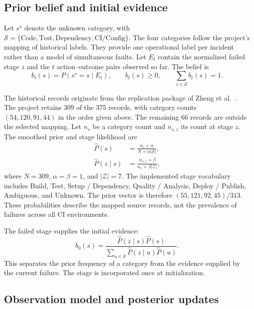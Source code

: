 \documentclass{article}
\begin{document}
\subsection{Prior belief and initial evidence}

Let $s^\star$ denote the unknown category, with
$\mathcal{S}=\{\text{Code},\text{Test},\text{Dependency},\text{CI/Config}\}$.
The four categories follow the project's mapping of historical labels.
They provide one operational label per incident rather than a model of
simultaneous faults. Let $E_t$ contain the normalized failed stage $z$ and
the $t$ action--outcome pairs observed so far. The belief is
\begin{equation}
b_t(s)=P(s^\star=s\mid E_t),
\qquad b_t(s)\geq 0,
\qquad \sum_{s\in\mathcal{S}}b_t(s)=1.
\label{eq:prob_belief}
\end{equation}

The historical records originate from the replication package of Zheng
et al.~\cite{Zheng2026WorkflowFailures}. The project retains 309 of the
375 records, with category counts $(54,120,91,44)$ in the order given above.
The remaining 66 records are outside the selected mapping. Let $n_s$ be a
category count and $n_{s,z}$ its count at stage $z$. The smoothed prior and
stage likelihood are
\begin{align}
\widehat{P}(s)
&=\frac{n_s+\alpha}{N+\alpha|\mathcal{S}|},
\label{eq:prob_prior}\\
\widehat{P}(z\mid s)
&=\frac{n_{s,z}+\beta}{n_s+\beta|\mathcal{Z}|},
\label{eq:prob_stage}
\end{align}
where $N=309$, $\alpha=\beta=1$, and $|\mathcal{Z}|=7$. The implemented
stage vocabulary includes Build, Test, Setup / Dependency, Quality /
Analysis, Deploy / Publish, Ambiguous, and Unknown. The prior vector is
therefore $(55,121,92,45)/313$. These probabilities describe the mapped
source records, not the prevalence of failures across all CI environments.

The failed stage supplies the initial evidence:
\begin{equation}
b_0(s)=
\frac{\widehat{P}(z\mid s)\widehat{P}(s)}
{\sum_{u\in\mathcal{S}}\widehat{P}(z\mid u)\widehat{P}(u)}.
\label{eq:prob_initial_posterior}
\end{equation}
This separates the prior frequency of a category from the evidence supplied
by the current failure. The stage is incorporated once at initialization.

\subsection{Observation model and posterior updates}
\end{document}
